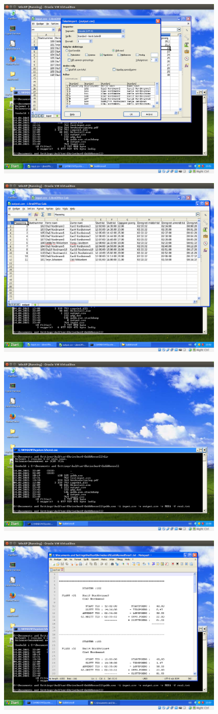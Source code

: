 \documentclass[12pt]{book}
\begin{document}
\includegraphics[width=11cm]{016}

\includegraphics[width=11cm]{017}

\includegraphics[width=11cm]{018}

\includegraphics[width=11cm]{019}
\end{document}
